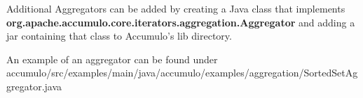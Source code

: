 Additional Aggregators can be added by creating a Java class that implements\\
\textbf{org.apache.accumulo.core.iterators.aggregation.Aggregator} and adding a jar containing that
class to Accumulo's lib directory.

An example of an aggregator can be found under\\
accumulo/src/examples/main/java/accumulo/examples/aggregation/SortedSetAggregator.java

